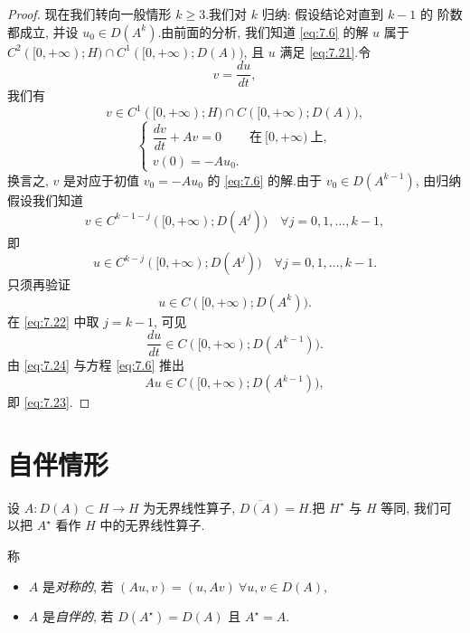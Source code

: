 \begin{proof}
现在我们转向一般情形 $k\ge3$.我们对 $k$ 归纳: 假设结论对直到 $k-1$ 的
阶数都成立, 并设 $u_0\in D(A^k)$.由前面的分析, 我们知道 \eqref{eq:7.6}
的解 $u$ 属于 $C^2([0,+\infty);H)\cap C^1([0,+\infty);D(A))$, 且 $u$ 满足
\eqref{eq:7.21}.令
\begin{equation*}
v=\frac{du}{dt},
\end{equation*}
我们有
\begin{equation*}
v\in C^1([0,+\infty);H)\cap C([0,+\infty);D(A)),
\end{equation*}
\begin{equation*}
\begin{cases}
\dfrac{dv}{dt}+Av=0 & \text{在}\ [0,+\infty)\ \text{上},\\
v(0)=-Au_0.
\end{cases}
\end{equation*}
换言之, $v$ 是对应于初值 $v_0=-Au_0$ 的 \eqref{eq:7.6} 的解.由于
$v_0\in D(A^{k-1})$, 由归纳假设我们知道
\begin{equation}
v\in C^{k-1-j}([0,+\infty);D(A^j))\quad\forall j=0,1,\dots,k-1,
\label{eq:7.22}
\end{equation}
即
\begin{equation*}
u\in C^{k-j}([0,+\infty);D(A^j))\quad\forall j=0,1,\dots,k-1.
\end{equation*}
只须再验证
\begin{equation}
u\in C([0,+\infty);D(A^k)).
\label{eq:7.23}
\end{equation}
在 \eqref{eq:7.22} 中取 $j=k-1$, 可见
\begin{equation}
\frac{du}{dt}\in C([0,+\infty);D(A^{k-1})).
\label{eq:7.24}
\end{equation}
由 \eqref{eq:7.24} 与方程 \eqref{eq:7.6} 推出
\begin{equation*}
Au\in C([0,+\infty);D(A^{k-1})),
\end{equation*}
即 \eqref{eq:7.23}.
\end{proof}

\section{自伴情形}
\label{sec:7.4}

设 $A:D(A)\subset H\to H$ 为无界线性算子, $\overline{D(A)}=H$.把
$H^\star$ 与 $H$ 等同, 我们可以把 $A^\star$ 看作 $H$ 中的无界线性算子.

\begin{definition}
称
\begin{itemize}[leftmargin=1.6em, itemsep=0.15em]
	\item $A$ 是\emph{对称的}, 若 $(Au,v)=(u,Av)\ \forall u,v\in D(A)$,
	\item $A$ 是\emph{自伴的}, 若 $D(A^\star)=D(A)$ 且 $A^\star=A$.
\end{itemize}
\end{definition}

